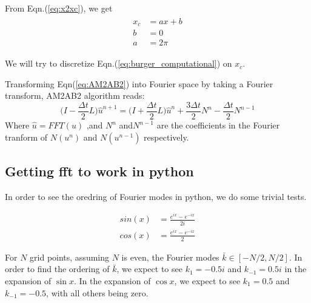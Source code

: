 \documentclass{article}
\begin{document}
From Eqn.(\ref{eq:x2xc}), we get
\begin{align}\label{eq:x2xc_Fourier}
 \begin{split}
  x_{c} &= ax + b\\
  b     &= 0\\
  a     &= 2\pi
 \end{split}
\end{align}

We will try to discretize Eqn.(\ref{eq:burger_computational}) on $x_{c}$. 

Transforming Eqn(\ref{eq:AM2AB2}) into Fourier space by taking a Fourier transform,  AM2AB2 algorithm reads:
\begin{equation}\label{eq:AM2AB2_Fourier}
 \bigg( I - \frac{\Delta t}{2} L \bigg) \hat{u}^{n+1} = \bigg( I + \frac{\Delta t}{2} L \bigg)\hat{u}^{n} + \frac{3 \Delta t}{2} N^{n} - \frac{\Delta t}{2} N^{n-1}
\end{equation}
Where $\hat{u} = FFT(u)$ ,and $N^{n}$ and$N^{n-1}$ are the coefficients in the Fourier tranform of $N(u^{n})$ and $N(u^{n-1})$ respectively.
\subsection{Getting fft to work in python}
In order to see the oredring of Fourier modes in python, we do some trivial tests.

\begin{align*}
 sin (x) &= \frac{e^{ix} - e^{-ix}}{2i}\\
 cos (x) &= \frac{e^{ix} - e^{-ix}}{2}
\end{align*}

For $N$ grid points, assuming $N$ is even, the Fourier modes $\bar{k} \in [-N/2, N/2]$. In order to find the ordering of $\bar{k}$, we expect to see $ k_{1} = -0.5i$ and $k_{-1} = 0.5 i$ in the expansion of $\sin{x}$. In the expansion of $\cos{x}$, we expect to see $ k_{1} = 0.5$ and $k_{-1} = -0.5$, with all others being zero. 
\end{document}
